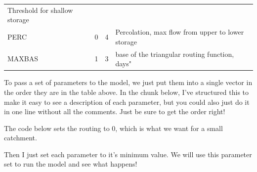 \documentclass[
]{book}
\begin{document}
\begin{longtable}[]{@{}llll@{}}
\begin{minipage}[t]{0.31\columnwidth}
Threshold for shallow storage\strut
\end{minipage}\tabularnewline
\begin{minipage}[t]{0.29\columnwidth}\raggedright
PERC\strut
\end{minipage} & \begin{minipage}[t]{0.16\columnwidth}\raggedright
0\strut
\end{minipage} & \begin{minipage}[t]{0.13\columnwidth}\raggedright
4\strut
\end{minipage} & \begin{minipage}[t]{0.31\columnwidth}\raggedright
Percolation, max flow from upper to lower storage\strut
\end{minipage}\tabularnewline
\begin{minipage}[t]{0.29\columnwidth}\raggedright
MAXBAS\strut
\end{minipage} & \begin{minipage}[t]{0.16\columnwidth}\raggedright
1\strut
\end{minipage} & \begin{minipage}[t]{0.13\columnwidth}\raggedright
3\strut
\end{minipage} & \begin{minipage}[t]{0.31\columnwidth}\raggedright
base of the triangular routing function, days"\strut
\end{minipage}\tabularnewline
\bottomrule
\end{longtable}

To pass a set of parameters to the model, we just put them into a single vector in the order they are in the table above. In the chunk below, I've structured this to make it easy to see a description of each parameter, but you could also just do it in one line without all the comments. Just be sure to get the order right!

The code below sets the routing to 0, which is what we want for a small catchment.

Then I just set each parameter to it's minimum value. We will use this parameter set to run the model and see what happens!
\end{document}
